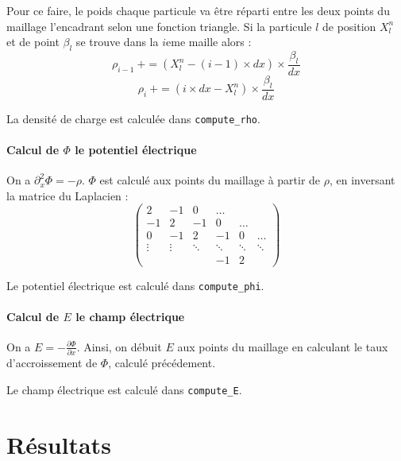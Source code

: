 \documentclass[a4paper,11pt]{article}
\newcommand{\Python}[1]{\texttt{#1}}
\begin{document}
Pour ce faire, le poids chaque particule va être réparti entre les deux points du maillage l'encadrant selon une fonction triangle. Si la particule $l$ de position $X_l^n$ et de point $\beta_l$ se trouve dans la $i$eme maille alors :
$$
\rho_{i -1} \ += (X_l^n - (i-1)\times dx) \times \frac{\beta_l}{dx} $$ $$
\rho_{i}\ += (i\times dx - X_l^n) \times \frac{\beta_l}{dx} 
$$

La densité de charge est calculée dans \Python{compute_rho}.

\paragraph{Calcul de $\Phi$ le potentiel électrique}
On a $\partial_x^2 \Phi = - \rho$. $\Phi$ est calculé aux points du maillage à partir de $\rho$, en inversant la matrice du Laplacien :
$$
\left( \begin{matrix}
2 & -1 & 0 & \dots \\
-1 & 2 & -1 & 0 & \dots \\
0 & -1 & 2 & -1 & 0 & \dots \\
\vdots & \vdots & \ddots & \ddots & \ddots & \ddots \\
& & & -1 & 2
\end{matrix}
\right)
$$

Le potentiel électrique est calculé dans \Python{compute_phi}.

\paragraph{Calcul de $E$ le champ électrique}
On a $E = - \frac{\partial \Phi}{\partial x}$. Ainsi, on débuit $E$ aux points du maillage en calculant le taux d'accroissement de $\Phi$, calculé précédement. 

Le champ électrique est calculé dans \Python{compute_E}.

\section{Résultats}
\end{document}
